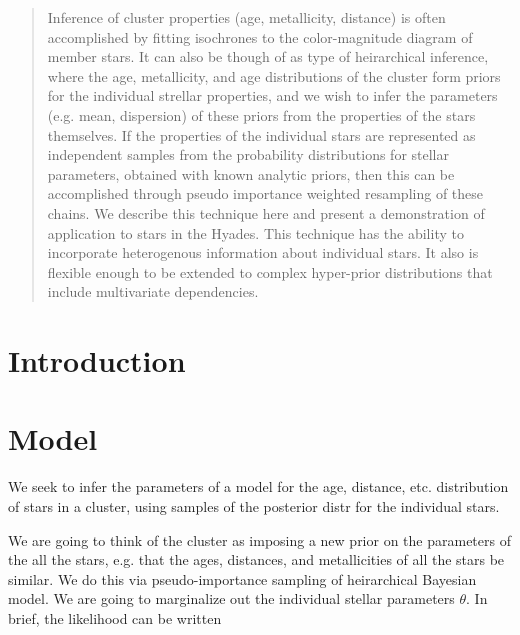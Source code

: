 \documentclass[modern]{aastex6}
\begin{document}
\author{B. Johnson}


\begin{abstract}
Inference of cluster properties (age, metallicity, distance) is often
 accomplished by fitting isochrones to the color-magnitude diagram of member
 stars.
It can also be though of as type of heirarchical inference, where the age,
 metallicity, and age distributions of the cluster form priors for the
 individual strellar properties, and we wish to infer the parameters (e.g. mean,
 dispersion) of these priors from the properties of the stars themselves.
If the properties of the individual stars are represented as independent samples from the
 probability distributions for stellar parameters, obtained with known
 analytic priors, then this can be accomplished through pseudo importance
 weighted resampling of these chains.
We describe this technique here and present a demonstration of application to
  stars in the Hyades.
This technique has the ability to incorporate heterogenous information about
  individual stars.
It also is flexible enough to be extended to complex hyper-prior distributions
  that include multivariate dependencies.
\end{abstract}


\section{Introduction}

\section{Model}
We seek to infer the parameters of a model for the age, distance, etc. distribution of stars in a cluster, using samples of the posterior distr for the individual stars.

We are going to think of the cluster as imposing a new prior on the parameters of the all the stars, 
e.g. that the ages, distances, and metallicities of all the stars be similar.
We do this via pseudo-importance sampling of heirarchical Bayesian model.
We are going to marginalize out the individual stellar parameters $\theta$.
In brief, the likelihood can be written
\end{document}
